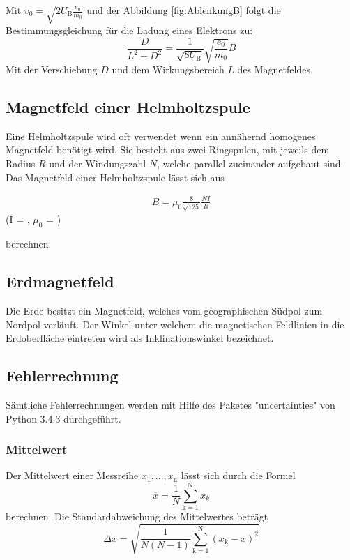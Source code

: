 Mit $v_0 = \sqrt{2 U_\text{B} \frac{e_0}{m_0}}$ und der Abbildung \eqref{fig:AblenkungB} folgt die Bestimmungsgleichung für die Ladung eines Elektrons zu:
\begin{equation}
	\frac{D}{L^2 + D^2} = \frac{1}{\sqrt{8 U_\text{B}}} \sqrt{\frac{e_0}{m_0}} B
	\label{eqn:e0m}
\end{equation}
Mit der Verschiebung $D$ und dem Wirkungsbereich $L$ des Magnetfeldes.

\subsection{Magnetfeld einer Helmholtzspule}
Eine Helmholtzspule wird oft verwendet wenn ein annähernd homogenes Magnetfeld benötigt wird. Sie besteht aus zwei Ringspulen, mit jeweils dem Radius $R$ und der Windungszahl $N$, welche parallel zueinander aufgebaut sind. Das Magnetfeld einer Helmholtzspule lässt sich aus
\begin{center}
	\begin{align}
		B = \mu_0 \frac{8}{\sqrt{125}} \frac{N I}{R}
		\label{eqn:BH}
	\end{align}
	\small{(I = , $\mu_0$ = )}
\end{center}
berechnen.

\subsection{Erdmagnetfeld}
Die Erde besitzt ein Magnetfeld, welches vom geographischen Südpol zum Nordpol verläuft. Der Winkel unter welchem die magnetischen Feldlinien in die Erdoberfläche eintreten wird als Inklinationswinkel bezeichnet.

\subsection{Fehlerrechnung}
Sämtliche Fehlerrechnungen werden mit Hilfe des Paketes "uncertainties" von Python 3.4.3 durchgeführt.
\subsubsection{Mittelwert}
Der Mittelwert einer Messreihe $x_\text{1}, ... ,x_\text{n}$ lässt sich durch die Formel
\begin{equation}
	\overline{x} = \frac{1}{N} \sum_{\text{k}=1}^\text{N} x_k
	\label{eqn:ave}
\end{equation}
berechnen. Die Standardabweichung des Mittelwertes beträgt
\begin{equation}
	\Delta \overline{x} = \sqrt{ \frac{1}{N(N-1)} \sum_{\text{k}=1}^\text{N} (x_\text{k} - \overline{x})^2}
	\label{eqn:std}
\end{equation}

